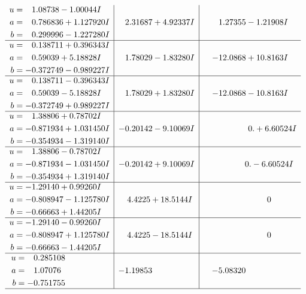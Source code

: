 \documentclass[1p]{elsarticle_modified}
\theoremstyle{definition}
\begin{document}
$$\begin{array}{c|c|c}
\begin{aligned}
u &= \phantom{-}1.08738 - 1.00044 I \\
a &= \phantom{-}0.786836 + 1.127920 I \\
b &= \phantom{-}0.299996 - 1.227280 I\end{aligned}
 & \phantom{-}2.31687 + 4.92337 I & \phantom{-}1.27355 - 1.21908 I \\ \hline\begin{aligned}
u &= \phantom{-}0.138711 + 0.396343 I \\
a &= \phantom{-}0.59039 + 5.18828 I \\
b &= -0.372749 - 0.989227 I\end{aligned}
 & \phantom{-}1.78029 - 1.83280 I & -12.0868 + 10.8163 I \\ \hline\begin{aligned}
u &= \phantom{-}0.138711 - 0.396343 I \\
a &= \phantom{-}0.59039 - 5.18828 I \\
b &= -0.372749 + 0.989227 I\end{aligned}
 & \phantom{-}1.78029 + 1.83280 I & -12.0868 - 10.8163 I \\ \hline\begin{aligned}
u &= \phantom{-}1.38806 + 0.78702 I \\
a &= -0.871934 + 1.031450 I \\
b &= -0.354934 - 1.319140 I\end{aligned}
 & -0.20142 - 9.10069 I & \phantom{-0.000000 -}0. + 6.60524 I \\ \hline\begin{aligned}
u &= \phantom{-}1.38806 - 0.78702 I \\
a &= -0.871934 - 1.031450 I \\
b &= -0.354934 + 1.319140 I\end{aligned}
 & -0.20142 + 9.10069 I & \phantom{-0.000000 } 0. - 6.60524 I \\ \hline\begin{aligned}
u &= -1.29140 + 0.99260 I \\
a &= -0.808947 - 1.125780 I \\
b &= -0.66663 + 1.44205 I\end{aligned}
 & \phantom{-}4.4225 + 18.5144 I & \phantom{-0.000000 } 0 \\ \hline\begin{aligned}
u &= -1.29140 - 0.99260 I \\
a &= -0.808947 + 1.125780 I \\
b &= -0.66663 - 1.44205 I\end{aligned}
 & \phantom{-}4.4225 - 18.5144 I & \phantom{-0.000000 } 0 \\ \hline\begin{aligned}
u &= \phantom{-}0.285108\phantom{ +0.000000I} \\
a &= \phantom{-}1.07076\phantom{ +0.000000I} \\
b &= -0.751755\phantom{ +0.000000I}\end{aligned}
 & -1.19853\phantom{ +0.000000I} & -5.08320\phantom{ +0.000000I}\\
 \hline 
 \end{array}$$\newpage\newpage\renewcommand{\arraystretch}{1}
\end{document}
